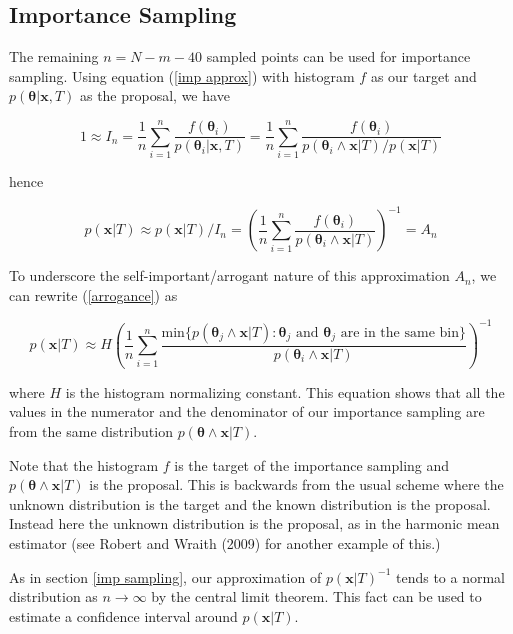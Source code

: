 \documentclass[letterpaper,12pt]{article}
\newcommand{\bx}{\boldsymbol x}
\newcommand{\btheta}{\boldsymbol \theta}
\begin{document}
\subsection{Importance Sampling}

The remaining $n = N - m - 40$ sampled points can be used for
importance sampling.  Using equation (\ref{imp approx}) with histogram $f$ as
our target and $p(\btheta|\bx, T)$ as the proposal, we have

\begin{equation*}
  1 \approx I_n = \frac{1}{n} \sum_{i=1}^n \frac{f(\btheta_i)}{p(\btheta_i|\bx, T)}
  = \frac{1}{n} \sum_{i=1}^n \frac{f(\btheta_i)}{p(\btheta_i \wedge \bx|T) / p(\bx|T)}
\end{equation*}

\noindent hence

\begin{equation} \label{arrogance}
  p(\bx|T) \approx p(\bx|T) / I_n = \left( \frac{1}{n} \sum_{i=1}^n
  \frac{f(\btheta_i)}{p(\btheta_i \wedge \bx|T)} \right)^{-1} = A_n
\end{equation}

\noindent To underscore the self-important/arrogant nature of
this approximation $A_n$, we can rewrite (\ref{arrogance}) as

\begin{equation*}
  p(\bx|T) \approx H \left( \frac{1}{n} \sum_{i=1}^n
    \frac{\mbox{min}\{p(\btheta_j \wedge \bx|T): \btheta_j \mbox{ and } \btheta_j \mbox{ are in the same bin}\}}{p(\btheta_i \wedge \bx|T)} \right)^{-1}
\end{equation*}

\noindent where $H$ is the histogram normalizing constant.  This
equation shows that all the values in the numerator and the
denominator of our importance sampling are from the same distribution 
$p(\btheta \wedge \bx|T)$.

Note that the histogram $f$ is the target of the importance sampling
and $p(\btheta \wedge \bx|T)$ is the proposal.  This is backwards from
the usual scheme where the unknown distribution is the target and the
known distribution is the proposal.  Instead here the unknown
distribution is the proposal, as in the harmonic mean estimator (see
Robert and Wraith (2009) for another example of this.)

As in section \ref{imp sampling}, our approximation of $p(\bx|T)^{-1}$
tends to a normal distribution as $n \to \infty$ by the central limit
theorem.  This fact can be used to estimate a confidence interval
around $p(\bx|T)$.
\end{document}
